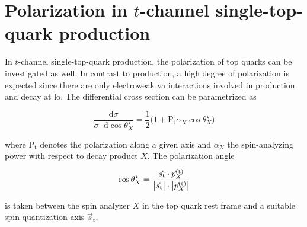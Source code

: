 \section{Polarization in $t$-channel single-top-quark production}
\label{sec:theory-t-channel-polarization}

In $t$-channel single-top-quark production, the polarization of top quarks can be investigated as well. In contrast to \ttbar production, a high degree of polarization is expected since there are only electroweak \gls{va} interactions involved in production and decay at \gls{lo}. The differential cross section can be parametrized as

\begin{equation}
\frac{\mathrm{d}\sigma}{\sigma\cdot\mathrm{d}\cos\theta^\star_{X}}=\frac{1}{2}\big(1+\mathrm{P}_\mathrm{t}\alpha_{X}\cos\theta^\star_{X}\big)
\end{equation}

where $\mathrm{P}_\mathrm{t}$ denotes the polarization along a given axis and $\alpha_{X}$ the spin-analyzing power with respect to decay product $X$. The polarization angle

\begin{equation}
\cos\theta^\star_{X}=\frac{\vec{s}_\mathrm{t}\cdot \vec{p}_{X}^\scriptn{\mathrm{(t)}}}{\big|\vec{s}_\mathrm{t}\big|\cdot\big|\vec{p}_{X}^\scriptn{\mathrm{(t)}}\big|}
\end{equation}

is taken between the spin analyzer $X$ in the top quark rest frame and a suitable spin quantization axis $\vec{s}_\mathrm{t}$. 

